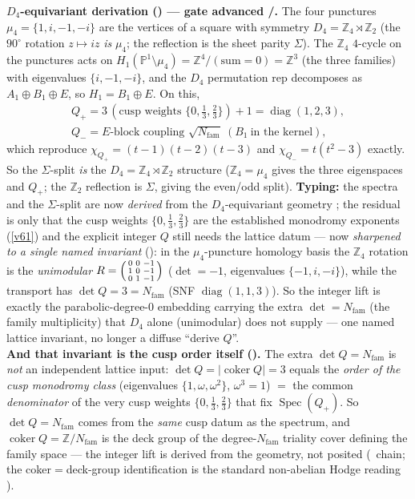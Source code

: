 \documentclass[11pt,a4paper]{article}
\newcommand{\Nfam}{N_{\mathrm{fam}}}
\newcommand{\PP}{\mathbb{P}}
\newcommand{\Z}{\mathbb{Z}}
\theoremstyle{definition}
\begin{document}
\begin{keybox}
\smallskip\noindent\textbf{$D_4$-equivariant derivation () --- gate advanced
\mC/\mE.} The four punctures $\mu_4=\{1,i,-1,-i\}$ are the vertices of a square with symmetry
$D_4=\Z_4\rtimes\Z_2$ (the $90^\circ$ rotation $z\!\mapsto\!iz$ \emph{is} $\mu_4$; the reflection is the
sheet parity $\Sigma$). The $\Z_4$ $4$-cycle on the punctures acts on $H_1(\PP^1\!\setminus\!\mu_4)=\Z^4/(\text{sum}{=}0)=\Z^3$
(the three families) with eigenvalues $\{i,-1,-i\}$, and the $D_4$ permutation rep decomposes as
$A_1\!\oplus\!B_1\!\oplus\!E$, so $H_1=B_1\oplus E$. On this,
\[
  \begin{gathered}
  Q_+=3\,(\text{cusp weights }\{0,\tfrac13,\tfrac23\})+1=\operatorname{diag}(1,2,3),\\[2pt]
  Q_-=\text{$E$-block coupling }\sqrt{\Nfam}\ (B_1\ \text{in the kernel}),
  \end{gathered}
\]
which reproduce $\chi_{Q_+}=(t{-}1)(t{-}2)(t{-}3)$ and $\chi_{Q_-}=t(t^2{-}3)$ exactly. So the $\Sigma$-split
\emph{is} the $D_4=\Z_4\rtimes\Z_2$ structure ($\Z_4{=}\mu_4$ gives the three eigenspaces and $Q_+$; the
$\Z_2$ reflection is $\Sigma$, giving the even/odd split). \textbf{Typing:} the spectra and the
$\Sigma$-split are now \emph{derived} from the $D_4$-equivariant geometry \mE; the residual is only that the
cusp weights $\{0,\tfrac13,\tfrac23\}$ are the established monodromy exponents (\vref{v61}) and the explicit integer
$Q$ still needs the lattice datum --- now \emph{sharpened to a single named invariant}
(): in the $\mu_4$-puncture homology basis the $\Z_4$ rotation is the
\emph{unimodular} $R=\begin{psmallmatrix}0&0&-1\\1&0&-1\\0&1&-1\end{psmallmatrix}$ ($\det{=}{-}1$, eigenvalues
$\{-1,i,-i\}$), while the transport has $\boxed{\det Q=3=\Nfam}$ (SNF $\operatorname{diag}(1,1,3)$). So the
integer lift is exactly the parabolic-degree-$0$ embedding carrying the extra $\det=\Nfam$ (the family
multiplicity) that $D_4$ alone (unimodular) does not supply --- one named lattice invariant, no longer a
diffuse ``derive $Q$''.
\smallskip\\
\noindent\textbf{And that invariant is the cusp order itself ().} The extra
$\det Q=\Nfam$ is \emph{not} an independent lattice input: $\det Q=|\!\operatorname{coker}Q|=3$ equals the
\emph{order of the cusp monodromy class} (eigenvalues $\{1,\omega,\omega^2\}$, $\omega^3{=}1$) $=$ the common
\emph{denominator} of the very cusp weights $\{0,\tfrac13,\tfrac23\}$ that fix $\operatorname{Spec}(Q_+)$. So
$\det Q=\Nfam$ comes from the \emph{same} cusp datum as the spectrum, and $\operatorname{coker}Q=\Z/\Nfam$ is
the deck group of the degree-$\Nfam$ triality cover defining the family space --- the integer lift is derived
from the geometry, not posited (\mE\ chain; the coker$=$deck-group identification is the standard non-abelian
Hodge reading \mE).
\end{keybox}
\end{document}
